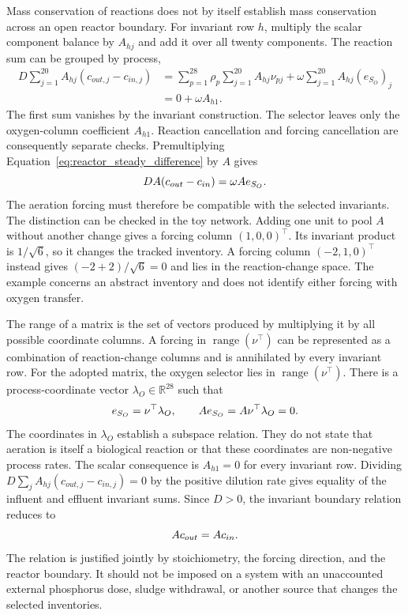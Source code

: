 Mass conservation of reactions does not by itself establish mass conservation across an open reactor boundary. For invariant row $h$, multiply the scalar component balance by $A_{hj}$ and add it over all twenty components. The reaction sum can be grouped by process,
\[
\begin{aligned}
D\sum_{j=1}^{20}A_{hj}(c_{out,j}-c_{in,j})
&=\sum_{p=1}^{28}\rho_p\sum_{j=1}^{20}A_{hj}\nu_{pj}
+\omega\sum_{j=1}^{20}A_{hj}(e_{S_O})_j\\
&=0+\omega A_{h1}.
\end{aligned}
\]
The first sum vanishes by the invariant construction. The selector leaves only the oxygen-column coefficient $A_{h1}$. Reaction cancellation and forcing cancellation are consequently separate checks. Premultiplying Equation~\eqref{eq:reactor_steady_difference} by $A$ gives
\begin{equation}
\equationname{Reactor invariant equation including oxygen transfer}
D A(c_{out}-c_{in})=\omega A e_{S_O}.
\label{eq:invariant_boundary_balance}
\end{equation}
The aeration forcing must therefore be compatible with the selected invariants. The distinction can be checked in the toy network. Adding one unit to pool $A$ without another change gives a forcing column $(1,0,0)^\top$. Its invariant product is $1/\sqrt6$, so it changes the tracked inventory. A forcing column $(-2,1,0)^\top$ instead gives $(-2+2)/\sqrt6=0$ and lies in the reaction-change space. The example concerns an abstract inventory and does not identify either forcing with oxygen transfer.

The range of a matrix is the set of vectors produced by multiplying it by all possible coordinate columns. A forcing in $\operatorname{range}(\nu^\top)$ can be represented as a combination of reaction-change columns and is annihilated by every invariant row. For the adopted matrix, the oxygen selector lies in $\operatorname{range}(\nu^\top)$. There is a process-coordinate vector $\lambda_O\in\mathbb{R}^{28}$ such that
\begin{equation}
\equationname{Compatibility of oxygen forcing with mass conservation}
e_{S_O}=\nu^\top\lambda_O,\qquad
Ae_{S_O}=A\nu^\top\lambda_O=0.
\label{eq:oxygen_forcing_compatibility}
\end{equation}
The coordinates in $\lambda_O$ establish a subspace relation. They do not state that aeration is itself a biological reaction or that these coordinates are non-negative process rates. The scalar consequence is $A_{h1}=0$ for every invariant row. Dividing $D\sum_j A_{hj}(c_{out,j}-c_{in,j})=0$ by the positive dilution rate gives equality of the influent and effluent invariant sums. Since $D>0$, the invariant boundary relation reduces to
\begin{equation}
\equationname{Equality of influent and effluent invariant inventories}
Ac_{out}=Ac_{in}.
\label{eq:reactor_invariant_equality}
\end{equation}
The relation is justified jointly by stoichiometry, the forcing direction, and the reactor boundary. It should not be imposed on a system with an unaccounted external phosphorus dose, sludge withdrawal, or another source that changes the selected inventories.

